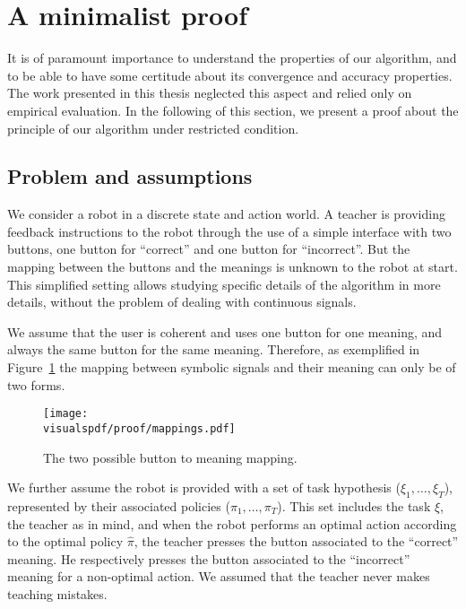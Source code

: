 
\section{A minimalist proof}
\label{chapter:limitations:proof}

It is of paramount importance to understand the properties of our algorithm, and to be able to have some certitude about its convergence and accuracy properties. The work presented in this thesis neglected this aspect and relied only on empirical evaluation. In the following of this section, we present a proof about the principle of our algorithm under restricted condition.


\subsection{Problem and assumptions}

We consider a robot in a discrete state and action world. A teacher is providing feedback instructions to the robot through the use of a simple interface with two buttons, one button for ``correct'' and one button for ``incorrect''. But the mapping between the buttons and the meanings is unknown to the robot at start. This simplified setting allows studying specific details of the algorithm in more details, without the problem of dealing with continuous signals.

We assume that the user is coherent and uses one button for one meaning, and always the same button for the same meaning. Therefore, as exemplified in Figure~\ref{fig:proofmapping} the mapping between symbolic signals and their meaning can only be of two forms. 

\begin{figure}[!htbp]
\centering
\texttt{[image: \\visualspdf/proof/mappings.pdf]}
\caption{The two possible button to meaning mapping.}
\label{fig:proofmapping}
\end{figure} 

We further assume the robot is provided with a set of task hypothesis ($\xi_1,\ldots,\xi_T$), represented by their associated policies ($\pi_1, \ldots, \pi_T$). This set includes the task $\hat{\xi}$, the teacher as in mind, and when the robot performs an optimal action according to the optimal policy $\hat{\pi}$, the teacher presses the button associated to the ``correct'' meaning. He respectively presses the button associated to the ``incorrect'' meaning for a non-optimal action. We assumed that the teacher never makes teaching mistakes.

